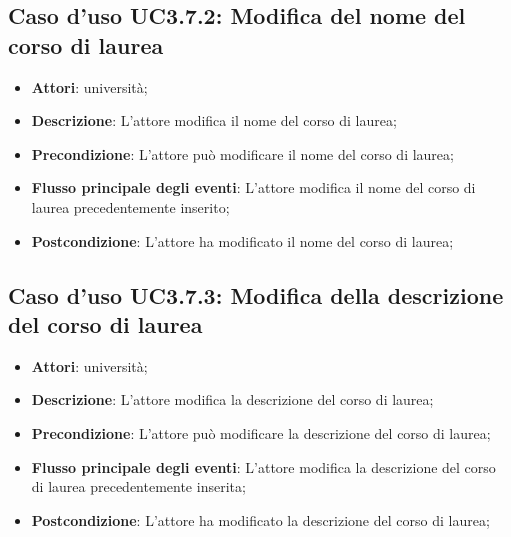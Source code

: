 \subsection{Caso d'uso \texorpdfstring{UC3.7.2}{UC3.7.2}: Modifica del nome del corso di laurea}
\begin{itemize}
\item \textbf{Attori}: università;
\item \textbf{Descrizione}: L'attore modifica il nome del corso di laurea;

\item \textbf{Precondizione}: L'attore può modificare il nome del corso di laurea;

\item \textbf{Flusso principale degli eventi}: L'attore modifica il nome del corso di laurea precedentemente inserito;

\item \textbf{Postcondizione}: L'attore ha modificato il nome del corso di laurea;

\end{itemize}
\subsection{Caso d'uso \texorpdfstring{UC3.7.3}{UC3.7.3}: Modifica della descrizione del corso di laurea}
\begin{itemize}
\item \textbf{Attori}: università;
\item \textbf{Descrizione}: L'attore modifica la descrizione del corso di laurea;

\item \textbf{Precondizione}: L'attore può modificare la descrizione del corso di laurea;

\item \textbf{Flusso principale degli eventi}: L'attore modifica la descrizione del corso di laurea precedentemente inserita;

\item \textbf{Postcondizione}: L'attore ha modificato la descrizione del corso di laurea;

\end{itemize}
